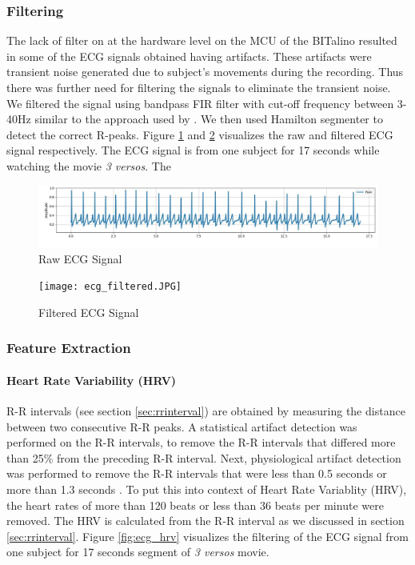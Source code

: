 \subsubsection{Filtering} The lack of filter on at the hardware level on the MCU \cite{noauthor_faq_nodate} of the BITalino resulted in some of the ECG signals obtained having artifacts. These artifacts were transient noise generated due to subject's movements during the recording. Thus there was further need for filtering the signals to eliminate the transient noise. We filtered the signal using bandpass FIR filter with cut-off frequency between 3-40Hz similar to the approach used by \citeauthor{canento_review_nodate} \cite{canento_review_nodate}. We then used Hamilton segmenter \cite{hamilton_open_2002} to detect the correct R-peaks. Figure \ref{fig:ecg_raw} and \ref{fig:ecg_filtered} visualizes the raw and filtered ECG signal respectively. The ECG signal is from one subject for 17 seconds while watching the movie \textit{3 versos}. The 

\begin{figure}
    \centering
    \includegraphics[width=150mm]{Figures/ecg_raw.jpg}
    \caption{Raw ECG Signal}
    \label{fig:ecg_raw}
\end{figure}

\begin{figure}
    \centering
    \texttt{[image: ecg\_filtered.JPG]}
    \caption{Filtered ECG Signal}
    \label{fig:ecg_filtered}
\end{figure}



\subsubsection{Feature Extraction} 
\label{sec:ecg_fet_ext}
\paragraph{Heart Rate Variability (HRV)} R-R intervals (see section \ref{sec:rrinterval}) are obtained by measuring the distance between two consecutive R-R peaks. A statistical artifact detection was performed on the R-R intervals, to remove the R-R intervals that differed more than 25\% from the preceding R-R interval. Next, physiological artifact detection was performed to remove the R-R intervals that were less than 0.5 seconds or more than 1.3 seconds \cite{noauthor_normal_2018}. To put this into context of Heart Rate Variablity (HRV), the heart rates of more than 120 beats or less than 36 beats per minute were removed. The HRV is calculated from the R-R interval as we discussed in section \ref{sec:rrinterval}. Figure \ref{fig:ecg_hrv} visualizes the filtering of the ECG signal from one subject for 17 seconds segment of \textit{3 versos} movie.

